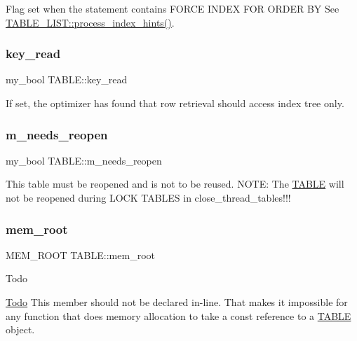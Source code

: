 Flag set when the statement contains F\+O\+R\+CE I\+N\+D\+EX F\+OR O\+R\+D\+ER BY See \mbox{\hyperlink{structTABLE__LIST_a088e2115774d6bc3dbc2d11d5db45a93}{T\+A\+B\+L\+E\+\_\+\+L\+I\+S\+T\+::process\+\_\+index\+\_\+hints()}}. \mbox{\label{structTABLE_a4580bb49e147af8adb714508a1891acb}} 
\subsubsection{\texorpdfstring{key\+\_\+read}{key\_read}}
{\footnotesize\ttfamily my\+\_\+bool T\+A\+B\+L\+E\+::key\+\_\+read}

If set, the optimizer has found that row retrieval should access index tree only. \mbox{\label{structTABLE_a3cfec9aee859fac059aa0f7cbecfbc92}} 
\subsubsection{\texorpdfstring{m\+\_\+needs\+\_\+reopen}{m\_needs\_reopen}}
{\footnotesize\ttfamily my\+\_\+bool T\+A\+B\+L\+E\+::m\+\_\+needs\+\_\+reopen}

This table must be reopened and is not to be reused. N\+O\+TE\+: The \mbox{\hyperlink{structTABLE}{T\+A\+B\+LE}} will not be reopened during L\+O\+CK T\+A\+B\+L\+ES in close\+\_\+thread\+\_\+tables!!! \mbox{\label{structTABLE_aa76fd5e13a8b5101a247413701978730}} 
\subsubsection{\texorpdfstring{mem\+\_\+root}{mem\_root}}
{\footnotesize\ttfamily M\+E\+M\+\_\+\+R\+O\+OT T\+A\+B\+L\+E\+::mem\+\_\+root}

\begin{DoxyRefDesc}{Todo}
\item[\mbox{\hyperlink{todo__todo000132}{Todo}}]This member should not be declared in-\/line. That makes it impossible for any function that does memory allocation to take a const reference to a \mbox{\hyperlink{structTABLE}{T\+A\+B\+LE}} object. \end{DoxyRefDesc}
\mbox{\label{structTABLE_af5b5d196e9820dbb42d6bd2a2524b801}} 
